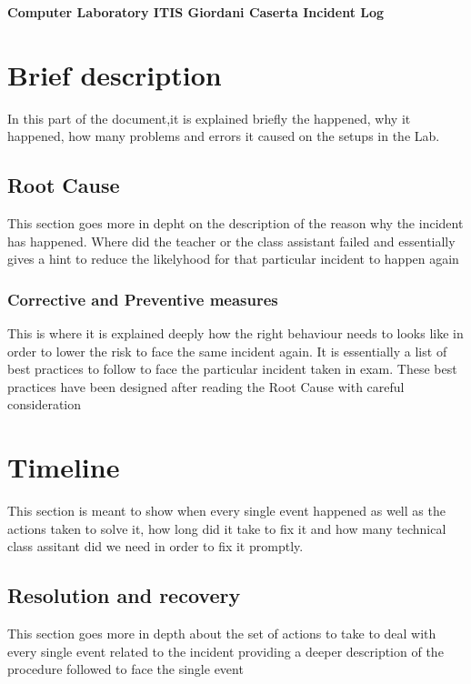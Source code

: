 \documentclass[a4paper,12pt]{article}
\begin{document}
\textbf{Computer Laboratory ITIS Giordani Caserta Incident Log}


\tableofcontents
\clearpage

\Large
\section{Brief description}
\normalsize
In this part of the document,it is explained briefly the  happened, why it happened, how many problems and errors it caused on the setups in the Lab.

\Large
\subsection{Root Cause}
\normalsize
This section goes more in depht on the description of the reason why the incident has happened. Where did the teacher or the class assistant failed and essentially gives a hint to reduce the likelyhood for that particular incident to happen again

\Large
\subsubsection{Corrective and Preventive measures}
\normalsize
This is where it is explained deeply how the right behaviour needs to looks like in order to lower the risk to face the same incident again. It is essentially a list of best practices to follow to face the particular incident taken in exam. These best practices have been designed after reading the Root Cause with careful consideration

\Large
\section{Timeline}
\normalsize
This section is meant to show when every single event happened as well as the actions taken to solve it, how long did it take to fix it and how many technical class assitant did we need in order to fix it promptly.

\Large
\subsection{Resolution and recovery}
\normalsize
This section goes more in depth about the set of actions to take to deal with every single event related to the incident providing a deeper description of the procedure followed to face the single event
\clearpage
\end{document}
